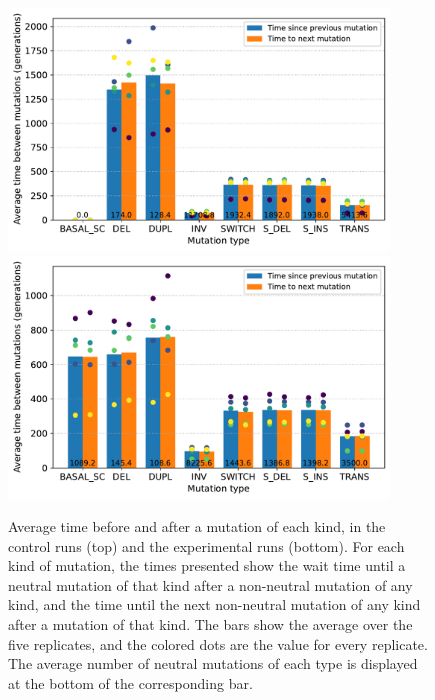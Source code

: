 \begin{figure}
  \centering
  \includegraphics[width=0.9\textwidth]{aevol/images/epistasis_control.pdf}
  \includegraphics[width=0.9\textwidth]{aevol/images/epistasis_sc.pdf}
  \caption[Measuring epistasis with the average times before and after mutations]{Average time before and after a mutation of each kind, in the control runs (top) and the experimental runs (bottom).
  For each kind of mutation, the times presented show the wait time until a neutral mutation of that kind after a non-neutral mutation of any kind, and the time until the next non-neutral mutation of any kind after a mutation of that kind.
  The bars show the average over the five replicates, and the colored dots are the value for every replicate.
  The average number of neutral mutations of each type is displayed at the bottom of the corresponding bar.}
  \label{fig:aevol:epistasis}
\end{figure}

